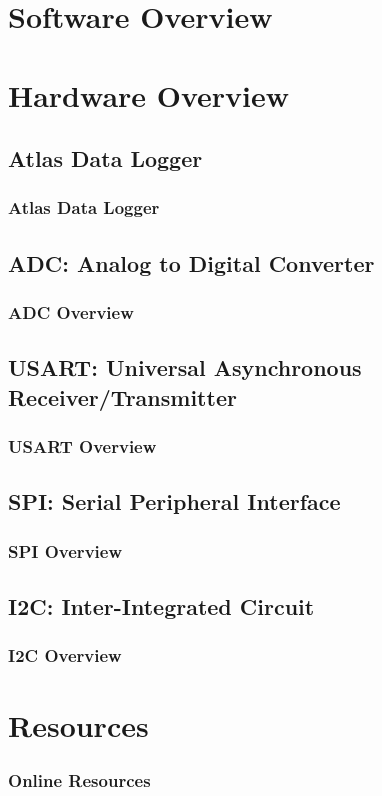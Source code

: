 \section{Software Overview}

\section{Hardware Overview}
\subsection{Atlas Data Logger}
\begin{frame}
	\frametitle{Atlas Data Logger}
\end{frame}

\subsection{ADC: Analog to Digital Converter}
\begin{frame}
	\frametitle{ADC Overview}
\end{frame}

\subsection{USART: Universal Asynchronous Receiver/Transmitter}
\begin{frame}
	\frametitle{USART Overview}
\end{frame}

\subsection{SPI: Serial Peripheral Interface}
\begin{frame}
	\frametitle{SPI Overview}
\end{frame}

\subsection{I2C: Inter-Integrated Circuit}
\begin{frame}
	\frametitle{I2C Overview}
\end{frame}

\section{Resources}
\begin{frame}
	\frametitle{Online Resources}
\end{frame}